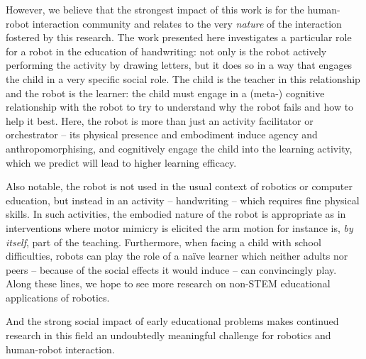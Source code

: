 \documentclass{sig-alternate}
\begin{document}
However, we believe that the strongest impact of this work is for the human-robot
interaction community and relates to the very \emph{nature} of the interaction
fostered by this research. The work presented here investigates a particular
role for a robot in the education of handwriting: not only is the robot actively
performing the activity by drawing letters, but it does so in a way that engages
the child in a very specific social role. The child is the teacher in this relationship and the robot is
the learner: the child must engage in a (meta-) cognitive relationship with the robot
to try to understand why the robot fails and how to help it best.  Here, the
robot is more than just an activity facilitator or orchestrator -- its physical presence
and embodiment induce agency and anthropomorphising, and cognitively engage the
child into the learning activity, which we predict will lead to higher learning
efficacy.

Also notable, the robot is not used in the usual context of robotics or computer
education, but instead in an activity -- handwriting -- which requires fine
physical skills. In such activities, the embodied nature of the robot is appropriate as in interventions where motor mimicry is elicited \cite{Berninger1997} the arm motion for instance is, \emph{by
itself}, part of the teaching. Furthermore, when facing a child with school 
difficulties, robots can play the role of a na\"ive learner which neither adults 
nor peers -- because of the social effects it would induce -- can convincingly 
play. Along these lines, we hope to see more research
on non-STEM educational applications of robotics.


And the strong social impact of early educational problems makes continued research in this field
an undoubtedly meaningful challenge for robotics and human-robot interaction.

%





\end{document}
